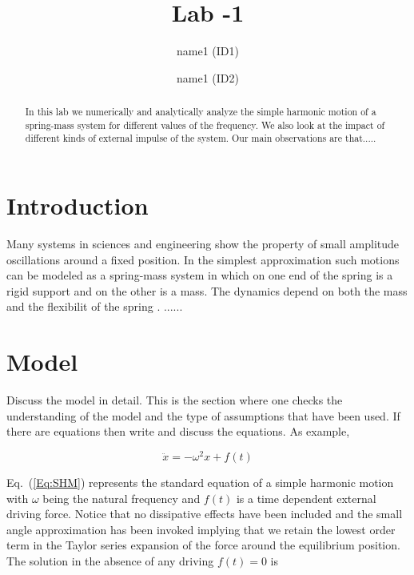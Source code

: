 \documentclass[aps,twocolumn,10pt,reprint]{revtex4}
\newcommand{\be}{\begin{equation}}
\newcommand{\ee}{\end{equation}}
\begin{document}
\title{Lab -1}


\author{name1 (ID1)}
\author{name1 (ID2)}

\begin{abstract}

In this lab we numerically and analytically analyze the simple harmonic motion of a spring-mass system for different values of the frequency. We also look at the impact of different kinds of external impulse of the system. Our main observations are that.....   

\end{abstract}
\maketitle
\section{Introduction}
Many systems in sciences and engineering show the property of small amplitude oscillations around a fixed position\cite{Ei35}. In the simplest approximation such motions can be modeled as a spring-mass system in which on one end of the spring is a rigid support and on the other is a mass. The dynamics depend on both the mass and the flexibilit of the spring \cite{Sh06}. ...... 
\section{Model}
Discuss the model in detail. This is the section where one checks the understanding of the model and the type of assumptions that have been used. If there are equations then write and discuss the equations. As example,

\be\label{Eq:SHM}
\ddot{x} = -\omega^{2}x + f(t)
\ee


Eq.~(\ref{Eq:SHM}) represents the standard equation of a simple harmonic motion with $\omega$ being the natural frequency and $f(t)$ is a time dependent external driving force. Notice that no dissipative effects have been included and the small angle approximation has been invoked implying that we retain the lowest order term in the Taylor series expansion of the force around the equilibrium position. The solution in the absence of any driving $f(t) = 0$ is 
\end{document}
